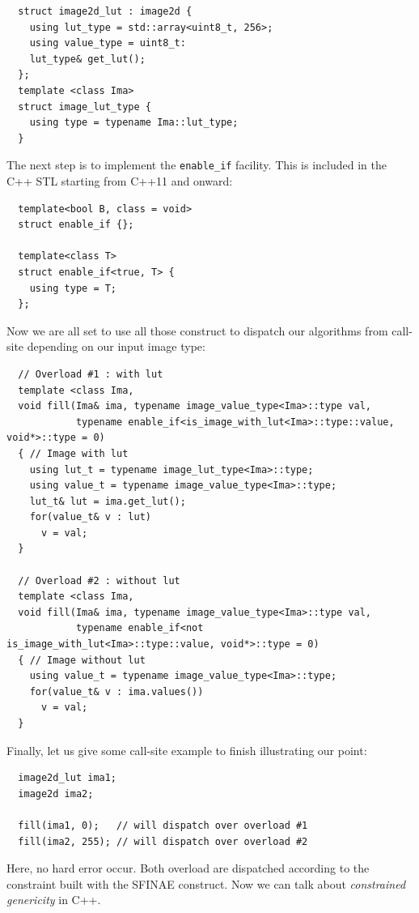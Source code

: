 \begin{verbatim}
  struct image2d_lut : image2d {
    using lut_type = std::array<uint8_t, 256>;
    using value_type = uint8_t:
    lut_type& get_lut();
  };
  template <class Ima>
  struct image_lut_type {
    using type = typename Ima::lut_type;
  }
\end{verbatim}

The next step is to implement the \texttt{enable\_if} facility. This is included in the C++ STL starting from C++11 and
onward:

\begin{verbatim}
  template<bool B, class = void>
  struct enable_if {};

  template<class T>
  struct enable_if<true, T> {
    using type = T;
  };
\end{verbatim}

Now we are all set to use all those construct to dispatch our algorithms from call-site depending on our input image
type:

\begin{verbatim}
  // Overload #1 : with lut
  template <class Ima, 
  void fill(Ima& ima, typename image_value_type<Ima>::type val,
            typename enable_if<is_image_with_lut<Ima>::type::value, void*>::type = 0)
  { // Image with lut
    using lut_t = typename image_lut_type<Ima>::type;
    using value_t = typename image_value_type<Ima>::type;
    lut_t& lut = ima.get_lut();
    for(value_t& v : lut)
      v = val;
  }

  // Overload #2 : without lut
  template <class Ima, 
  void fill(Ima& ima, typename image_value_type<Ima>::type val,
            typename enable_if<not is_image_with_lut<Ima>::type::value, void*>::type = 0)
  { // Image without lut
    using value_t = typename image_value_type<Ima>::type;
    for(value_t& v : ima.values())
      v = val;
  }
\end{verbatim}

Finally, let us give some call-site example to finish illustrating our point:

\begin{verbatim}
  image2d_lut ima1;
  image2d ima2;

  fill(ima1, 0);   // will dispatch over overload #1
  fill(ima2, 255); // will dispatch over overload #2
\end{verbatim}
Here, no hard error occur. Both overload are dispatched according to the constraint built with the SFINAE construct. Now
we can talk about \emph{constrained genericity} in C++.


